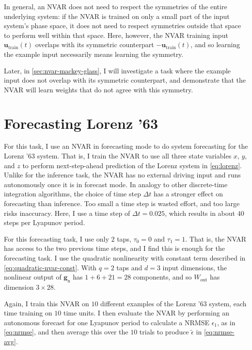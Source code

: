 In general, an NVAR does not need to respect the symmetries of the
entire underlying system: if the NVAR is trained on only a small part
of the input system's phase space, it does not need to respect
symmetries outside that space to perform well within that space. Here,
however, the NVAR training input $\bm{u}_\text{train}(t)$ overlaps
with its symmetric counterpart $-\bm{u}_\text{train}(t)$, and so learning
the example input necessarily means learning the symmetry.

Later, in \cref{sec:nvar-mackey-glass}, I will investigate a task
where the example input does not overlap with its symmetric
counterpart, and demonstrate that the NVAR will learn weights that do
not agree with this symmetry.

\section{Forecasting Lorenz '63}

For this task, I use an NVAR in forecasting mode to do system
forecasting for the Lorenz '63 system. That is, I train the NVAR to
use all three state variables $x$, $y$, and $z$ to perform
next-step-ahead prediction of the Lorenz system in
\cref{eq:lorenz}. Unlike for the inference task, the NVAR has no
external driving input and runs autonomously once it is in forecast
mode. In analogy to other discrete-time integration algorithms, the
choice of time step $\Delta t$ has a stronger effect on forecasting
than inference. Too small a time step is wasted effort, and too large
risks inaccuracy. Here, I use a time step of $\Delta t = 0.025$, which
results in about $40$ steps per Lyapunov period.

For this forecasting task, I use only $2$ taps, $\tau_0 = 0$ and
$\tau_1 = 1$. That is, the NVAR has access to the two previous time
steps, and I find this is enough for the forecasting task.  I use the
quadratic nonlinearity with constant term described in
\cref{eq:quadratic-nvar-const}. With $q = 2$ taps and $d = 3$ input dimensions,
the nonlinear output of $\bm{g}_\text{n}$ has $1 + 6 + 21 = 28$
components, and so $W_\text{out}$ has dimension $3 \times 28$.

Again, I train this NVAR on $10$ different examples of the Lorenz '63
system, each time training on $10$ time units. I then evaluate the
NVAR by performing an autonomous forecast for one Lyapunov period to
calculate a NRMSE $\epsilon_1$, as in \cref{eq:nrmse}, and then
average this over the $10$ trials to produce $\tilde{\epsilon}$ in
\cref{eq:nrmse-avg}.


